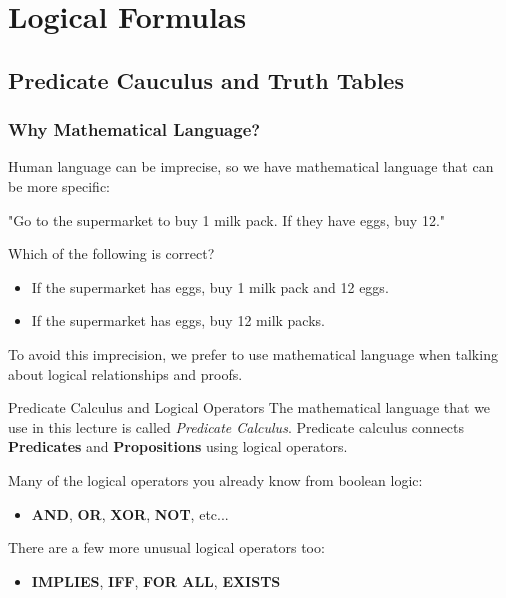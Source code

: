 \section{Logical Formulas}

\frame{\tableofcontents[currentsection,hideallsubsections, firstsection=2, sections={2-4}]}


\subsection{Predicate Cauculus and Truth Tables}
\begin{frame}
  \frametitle{Why Mathematical Language?}
  Human language can be imprecise, so we have mathematical language that can be more specific:\bigskip

  \begin{center}
    "Go to the supermarket to buy 1 milk pack. If they have eggs, buy 12."
  \end{center}
  \bigskip

  Which of the following is correct?
  \begin{itemize}
    \item If the supermarket has eggs, buy 1 milk pack and 12 eggs.
    \item If the supermarket has eggs, buy 12 milk packs.
  \end{itemize}
  \bigskip

  To avoid this imprecision, we prefer to use mathematical language when talking about logical relationships and proofs.
\end{frame}


\begin{frame}{Predicate Calculus and Logical Operators}
  The mathematical language that we use in this lecture is called \emph{Predicate Calculus}. Predicate calculus connects {\bf Predicates} and {\bf Propositions} using logical operators.\bigskip

  Many of the logical operators you already know from boolean logic:
  \begin{itemize}
    \item {\bf AND}, {\bf OR}, {\bf XOR}, {\bf NOT}, etc...
  \end{itemize}\bigskip

  There are a few more unusual logical operators too:
  \begin{itemize}
    \item {\bf IMPLIES}, {\bf IFF}, {\bf FOR ALL}, {\bf EXISTS}
  \end{itemize}
\end{frame}


